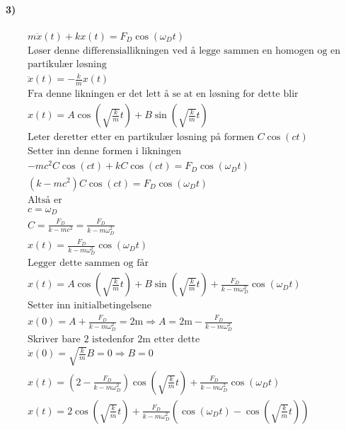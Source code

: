 \documentclass[11pt, A4paper,norsk]{article}
\begin{document}
		\paragraph{3)}
			\begin{gather*}
m \ddot{x}(t) + k x(t) = F_D \cos(\omega_D t) \\
\text{Løser denne differensiallikningen ved å legge sammen en homogen og en} \\
\text{partikulær løsning} \\
\ddot{x}(t) = - \frac{k}{m} x(t) \\
\text{Fra denne likningen er det lett å se at en løsning for dette blir} \\
x(t) = A \cos\left( \sqrt{\frac{k}{m}} t \right) + B \sin\left( \sqrt{\frac{k}{m}} t \right) \\
\text{Leter deretter etter en partikulær løsning på formen $C \cos(c t)$} \\
\text{Setter inn denne formen i likningen} \\
- m c^2 C \cos(c t) + k C \cos(c t) = F_D \cos( \omega_D t) \\
(k - m c^2)C \cos(c t) = F_D \cos(\omega_D t) \\
\text{Altså er} \\
c = \omega_D \\
C = \frac{F_D}{k - mc^2} = \frac{F_D}{k - m \omega_D^2} \\
x(t) = \frac{F_D}{k - m \omega_D^2} \cos\left( \omega_D t \right) \\
\text{Legger dette sammen og får} \\
x(t) = A \cos\left( \sqrt{\frac{k}{m}} t \right) + B \sin\left( \sqrt{\frac{k}{m}} t \right) + \frac{F_D}{k - m \omega_D^2} \cos\left( \omega_D t \right) \\
\text{Setter inn initialbetingelsene} \\
x(0) = A + \frac{F_D}{k - m \omega_D^2} = 2 \text{m} \Rightarrow A = 2 \text{m} - \frac{F_D}{k - m \omega_D^2} \\
\text{Skriver bare $2$ istedenfor $2 \text{m}$ etter dette} \\
\dot{x}(0) = \sqrt{\frac{k}{m}} B = 0 \Rightarrow B = 0 \\
x(t) = \left( 2 - \frac{F_D}{k - m \omega_D^2} \right) \cos\left( \sqrt{\frac{k}{m}} t \right) + \frac{F_D}{k - m \omega_D^2} \cos\left( \omega_D t \right) \\
x(t) = 2 \cos\left( \sqrt{\frac{k}{m}} t \right) + \frac{F_D}{k - m \omega_D^2} \left( \cos\left( \omega_D t \right) - \cos\left( \sqrt{\frac{k}{m}} t \right) \right) \\
			\end{gather*}
\end{document}
